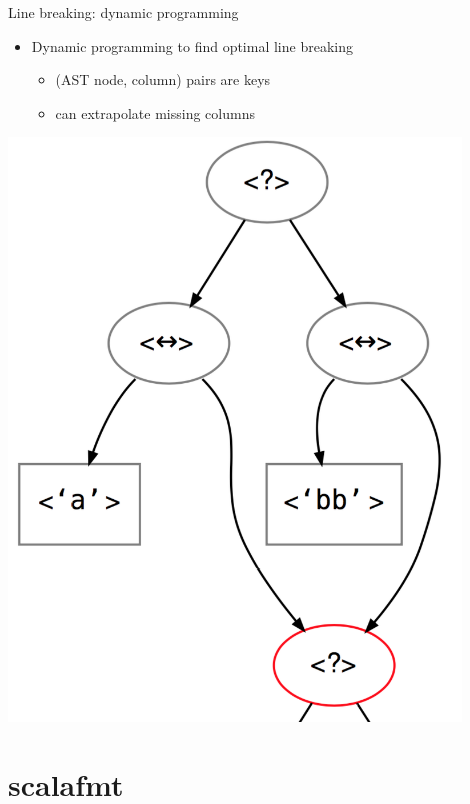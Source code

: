 \documentclass[xcolor=dvipsnames]{beamer}
\theoremstyle{definition}
\begin{document}
\begin{frame}{Line breaking: dynamic programming}
  \begin{minipage}{0.45\textwidth}
    \begin{itemize}
      \item Dynamic programming to find optimal line breaking
        \begin{itemize}
          \item (AST node, column) pairs are keys
          \item can extrapolate missing columns
        \end{itemize}
    \end{itemize}
  \end{minipage}
  \begin{minipage}{0.5\textwidth}
    \includegraphics[width=0.9\textwidth]{img/dp-rfmt.png}
  \end{minipage}
\end{frame}
\section{scalafmt} %
\label{sec:scalafmt}
\end{document}

